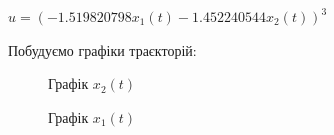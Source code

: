 \documentclass{article}
\begin{document}
$u = (-1.519820798x_1(t)-1.452240544x_2(t))^3$

Побудуємо графіки траєкторій:
\begin{figure}[h]
    \caption{Графік $x_2(t)$}
    \label{fig:image1}
\end{figure}

\begin{figure}[]
    \caption{Графік $x_1(t)$}
    \label{fig:image2}
\end{figure}
\end{document}
